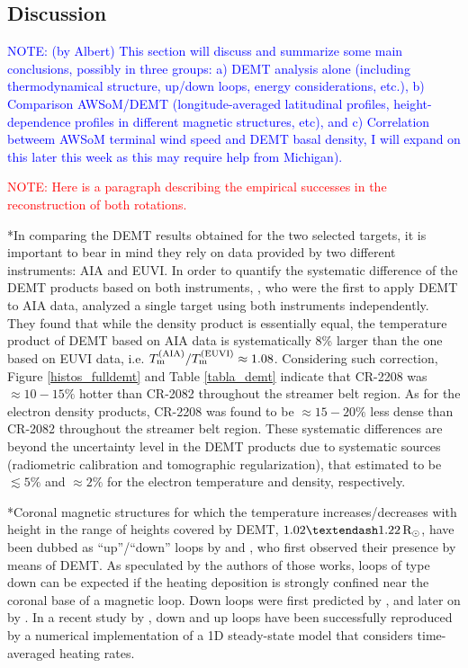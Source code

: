 \documentclass[namedreferences]{solarphysics}
\newcommand{\mrsun}{{\rm R_\odot}}
\newcommand{\Tm}{T_{\rm m}}
\def\diego#1{\textcolor{red}{#1}}
\def\notebyalbert#1{\textcolor{blue}{NOTE: #1}}
\begin{document}
\begin{article}
\section{Discussion}\label{discu} 

\noindent\notebyalbert{(by Albert) This section will discuss and summarize some main conclusions, possibly in three groups: a) DEMT analysis alone (including thermodynamical structure, up/down loops, energy considerations, etc.), b) Comparison AWSoM/DEMT (longitude-averaged latitudinal profiles, height-dependence profiles in different magnetic structures, etc), and c) Correlation betweem AWSoM terminal wind speed and DEMT basal density, I will expand on this later this week as this may require help from Michigan).} 

\diego{NOTE: Here is a paragraph describing the empirical successes in the reconstruction of both rotations.}

*In comparing the DEMT results obtained for the two selected targets, it is important to bear in mind they rely on data provided by two different instruments: AIA and EUVI. In order to quantify the systematic difference of the DEMT products based on both instruments, \citet{nuevo_2015}, who were the first to apply DEMT to AIA data, analyzed a single target using both instruments independently. They found that while the density product is essentially equal, the temperature product of DEMT based on AIA data is systematically 8\% larger than the one based on EUVI data, i.e. $\Tm^{\rm(AIA)}/\Tm^{\rm(EUVI)} \approx 1.08$. Considering such correction, Figure \ref{histos_fulldemt} and Table \ref{tabla_demt} indicate that CR-2208 was $\approx 10-15\%$ hotter than CR-2082 throughout the streamer belt region. As for the electron density products, CR-2208 was found to be $\approx 15-20\%$ less dense than CR-2082 throughout the streamer belt region. These systematic differences are beyond the uncertainty level in the DEMT products due to systematic sources (radiometric calibration and tomographic regularization), that \citet{lloveras_2017} estimated to be $\lesssim 5\%$ and $\approx 2\%$ for the electron temperature and density, respectively.


*Coronal magnetic structures for which the temperature increases/decreases with height in the range of heights covered by DEMT, $1.02–1.22\,\mrsun$, have been dubbed as “up”/“down” loops by \citet{huang_2012} and \citet{nuevo_2013}, who first observed their presence by means of DEMT. As speculated by the authors of those works, loops of type down can be expected if the heating deposition is strongly confined near the coronal base of a magnetic loop. Down loops were first predicted by \citet{serio_1981}, and later on by \citet{aschwanden_2002}. In a recent study by \citet{schiff_2016}, down and up loops have been successfully reproduced by a numerical implementation of a 1D steady-state model that considers time-averaged heating rates. 


\end{article}
\end{document}
